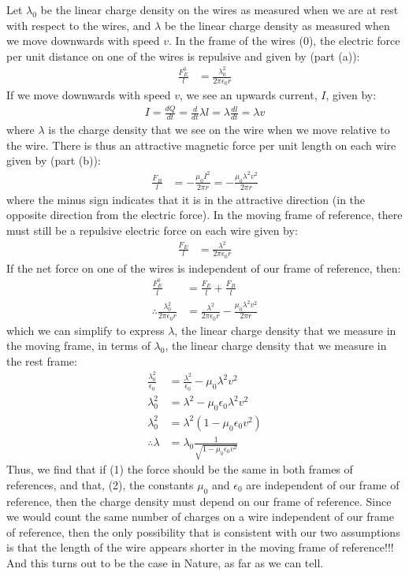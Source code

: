 \begin{solution}
\begin{parts}
Let $\lambda_0$ be the linear charge density on the wires as measured when we are at rest with respect to the wires, and $\lambda$ be the linear charge density as measured when we move downwards with speed $v$. In the frame of the wires ($0$), the electric force per unit distance on one of the wires is repulsive and given by (part (a)):
\begin{align*}
\frac{F_E^0}{l} &=\frac{\lambda_0^2}{2\pi\epsilon_0 r}
\end{align*}
If we move downwards with speed $v$, we see an upwards current, $I$, given by:
\begin{align*}
I=\frac{dQ}{dt}=\frac{d}{dt}\lambda l=\lambda \frac{dl}{dt}=\lambda v
\end{align*}
where $\lambda$ is the charge density that we see on the wire when we move relative to the wire. There is thus an attractive magnetic force per unit length on each wire given by (part (b)):
\begin{align*}
\frac{F_B}{l}&=-\frac{\mu_0I^2}{2\pi r}=-\frac{\mu_0\lambda^2v^2}{2\pi r}
\end{align*}
where the minus sign indicates that it is in the attractive direction (in the opposite direction from the electric force). In the moving frame of reference, there must still be a repulsive electric force on each wire given by:
\begin{align*}
\frac{F_E}{l} &=\frac{\lambda^2}{2\pi\epsilon_0 r}
\end{align*}
If the net force on one of the wires is independent of our frame of reference, then:
\begin{align*}
\frac{F_E^0}{l} &= \frac{F_E}{l}+\frac{F_B}{l}\\
\therefore \frac{\lambda_0^2}{2\pi\epsilon_0 r} &= \frac{\lambda^2}{2\pi\epsilon_0 r}-\frac{\mu_0\lambda^2v^2}{2\pi r}
\end{align*}
which we can simplify to express $\lambda$, the linear charge density that we measure in the moving frame, in terms of $\lambda_0$, the linear charge density that we measure in the rest frame:
\begin{align*}
\frac{\lambda_0^2}{\epsilon_0} &= \frac{\lambda^2}{\epsilon_0}-\mu_0\lambda^2v^2\\
\lambda_0^2&=\lambda^2-\mu_0\epsilon_0\lambda^2v^2\\
\lambda_0^2&=\lambda^2(1-\mu_0\epsilon_0v^2)\\
\therefore \lambda&=\lambda_0\frac{1}{\sqrt{1-\mu_0\epsilon_0v^2}}
\end{align*}
Thus, we find that if (1) the force should be the same in both frames of references, and that, (2), the constants $\mu_0$ and $\epsilon_0$ are independent of our frame of reference, then the charge density must depend on our frame of reference. Since we would count the same number of charges on a wire independent of our frame of reference, then the only possibility that is consistent with our two assumptions is that the length of the wire appears shorter in the moving frame of reference!!! And this turns out to be the case in Nature, as far as we can tell.


\end{parts}
\end{solution}
